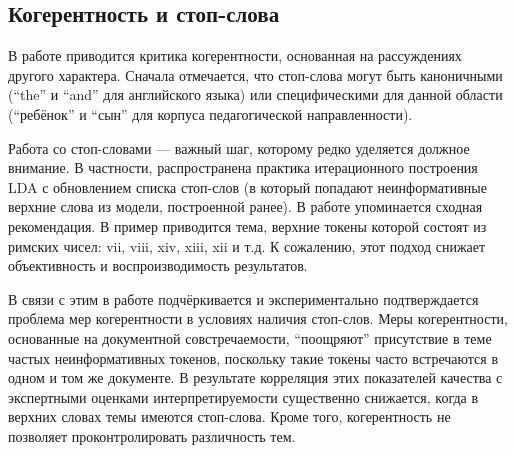 






\subsection{Когерентность и стоп-слова}

В работе \cite{fan2019assessing} приводится критика когерентности, основанная на рассуждениях другого характера. Сначала отмечается, что стоп-слова могут быть каноничными (``the'' и ``and'' для английского языка) или специфическими для данной области (``ребёнок'' и ``сын'' для корпуса педагогической направленности).

Работа со стоп-словами --- важный шаг, которому редко уделяется должное внимание. В частности, распространена практика итерационного построения LDA с обновлением списка стоп-слов (в который попадают неинформативные верхние слова из модели, построенной ранее). В работе \cite{boydcare} упоминается сходная рекомендация. В пример приводится тема, верхние токены которой состоят из римских чисел: vii, viii, xiv, xiii, xii и т.д. К сожалению, этот подход снижает объективность и воспроизводимость результатов.

В связи с этим в работе \cite{fan2019assessing} подчёркивается и экспериментально подтверждается проблема мер когерентности в условиях наличия стоп-слов. Меры когерентности, основанные на документной совстречаемости, ``поощряют'' присутствие в теме частых неинформативных токенов, поскольку такие токены часто встречаются в одном и том же документе. В результате корреляция
этих показателей качества с экспертными оценками интерпретируемости существенно снижается, когда в верхних словах темы имеются стоп-слова. Кроме того, когерентность не позволяет проконтролировать различность тем.

